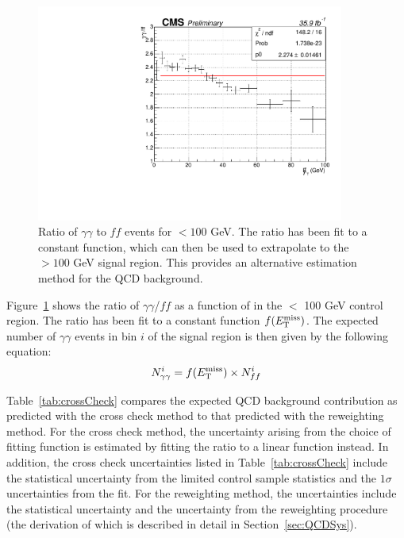 \begin{figure}[h]
\begin{center}
\includegraphics[width=0.9\textwidth]{Figures/DataAnalysis/crossCheckFit.pdf}
\end{center}
\caption[Ratio of $\gamma\gamma$ to $ff$ events for \ETmiss$ < 100$ GeV.]
{Ratio of $\gamma\gamma$ to $ff$ events for \ETmiss$ < 100$ GeV. 
The ratio has been fit to a constant function, which can then be used to 
extrapolate to the \ETmiss$ >100$ GeV signal region. 
This provides an alternative estimation method for the QCD background.}
\label{fig:crossCheck}
\end{figure}

Figure~\ref{fig:crossCheck} shows the ratio of $\gamma\gamma$/$ff$ as a function of \ETmiss in the \ETmiss $<$ 100 GeV control region. The ratio has been fit to a constant function $f(E_{\mathrm{T}}^{\text{miss}})$. The expected number of $\gamma\gamma$ events in bin $i$ of the signal region is then given by the following equation:
\begin{equation}
N_{\gamma\gamma}^i = f(E_{\mathrm{T}}^{\text{miss}}) \times N_{ff}^i 
\end{equation}

Table~\ref{tab:crossCheck} compares the expected QCD background contribution as predicted with the cross check method to that predicted with the \diempt reweighting method. For the cross check method, the uncertainty arising from the choice of fitting function is estimated by fitting the ratio to a linear function instead. In addition, the cross check uncertainties listed in Table~\ref{tab:crossCheck} include the statistical uncertainty from the limited control sample statistics and the $1\sigma$ uncertainties from the fit. For the \diempt reweighting method, the uncertainties include the statistical uncertainty and the uncertainty from the \diempt reweighting procedure (the derivation of which is described in detail in Section~\ref{sec:QCDSys}). 

